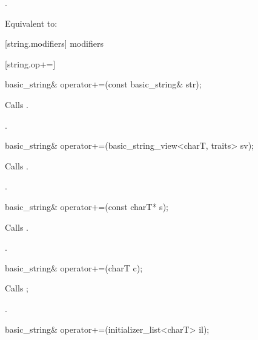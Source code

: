\begin{itemdescr}
\pnum
\requires
{}.

\pnum
\effects
Equivalent to: 
\end{itemdescr}

[string.modifiers]{ modifiers}

[string.op+=]{}

%
\begin{itemdecl}
basic_string&
  operator+=(const basic_string& str);
\end{itemdecl}

\begin{itemdescr}
\pnum
\effects Calls .

\pnum
\returns
{}.
\end{itemdescr}

%
\begin{itemdecl}
basic_string& operator+=(basic_string_view<charT, traits> sv);
\end{itemdecl}

\begin{itemdescr}
\pnum
\effects
Calls .

\pnum
\returns
{}.
\end{itemdescr}

%
\begin{itemdecl}
basic_string& operator+=(const charT* s);
\end{itemdecl}

\begin{itemdescr}
\pnum
\effects Calls .

\pnum
\returns
{}.
\end{itemdescr}

%
\begin{itemdecl}
basic_string& operator+=(charT c);
\end{itemdecl}

\begin{itemdescr}
\pnum
\effects Calls ;

\pnum
\returns
{}.
\end{itemdescr}

%
\begin{itemdecl}
basic_string& operator+=(initializer_list<charT> il);
\end{itemdecl}


